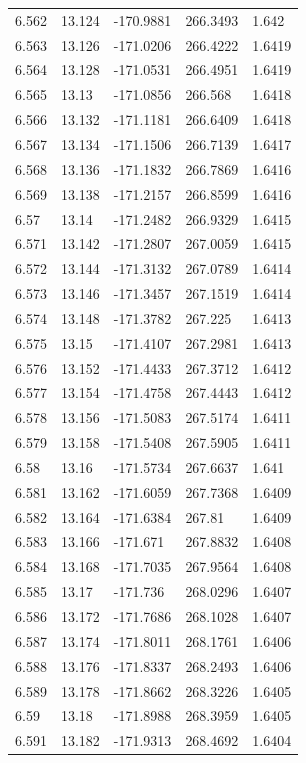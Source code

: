 \begin{tabular}{lllll}
6.562 & 13.124 & -170.9881 & 266.3493 & 1.642 \\
6.563 & 13.126 & -171.0206 & 266.4222 & 1.6419 \\
6.564 & 13.128 & -171.0531 & 266.4951 & 1.6419 \\
6.565 & 13.13 & -171.0856 & 266.568 & 1.6418 \\
6.566 & 13.132 & -171.1181 & 266.6409 & 1.6418 \\
6.567 & 13.134 & -171.1506 & 266.7139 & 1.6417 \\
6.568 & 13.136 & -171.1832 & 266.7869 & 1.6416 \\
6.569 & 13.138 & -171.2157 & 266.8599 & 1.6416 \\
6.57 & 13.14 & -171.2482 & 266.9329 & 1.6415 \\
6.571 & 13.142 & -171.2807 & 267.0059 & 1.6415 \\
6.572 & 13.144 & -171.3132 & 267.0789 & 1.6414 \\
6.573 & 13.146 & -171.3457 & 267.1519 & 1.6414 \\
6.574 & 13.148 & -171.3782 & 267.225 & 1.6413 \\
6.575 & 13.15 & -171.4107 & 267.2981 & 1.6413 \\
6.576 & 13.152 & -171.4433 & 267.3712 & 1.6412 \\
6.577 & 13.154 & -171.4758 & 267.4443 & 1.6412 \\
6.578 & 13.156 & -171.5083 & 267.5174 & 1.6411 \\
6.579 & 13.158 & -171.5408 & 267.5905 & 1.6411 \\
6.58 & 13.16 & -171.5734 & 267.6637 & 1.641 \\
6.581 & 13.162 & -171.6059 & 267.7368 & 1.6409 \\
6.582 & 13.164 & -171.6384 & 267.81 & 1.6409 \\
6.583 & 13.166 & -171.671 & 267.8832 & 1.6408 \\
6.584 & 13.168 & -171.7035 & 267.9564 & 1.6408 \\
6.585 & 13.17 & -171.736 & 268.0296 & 1.6407 \\
6.586 & 13.172 & -171.7686 & 268.1028 & 1.6407 \\
6.587 & 13.174 & -171.8011 & 268.1761 & 1.6406 \\
6.588 & 13.176 & -171.8337 & 268.2493 & 1.6406 \\
6.589 & 13.178 & -171.8662 & 268.3226 & 1.6405 \\
6.59 & 13.18 & -171.8988 & 268.3959 & 1.6405 \\
6.591 & 13.182 & -171.9313 & 268.4692 & 1.6404 \\

\end{tabular}
